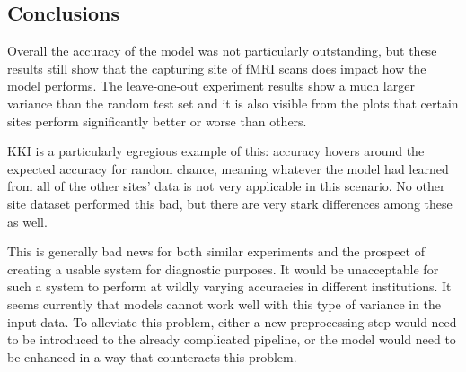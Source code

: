 	
	\subsection{Conclusions}
	
	
	Overall the accuracy of the model was not particularly outstanding, but these results still show that the capturing site of fMRI scans does impact how the model performs. The leave-one-out experiment results show a much larger variance than the random test set and it is also visible from the plots that certain sites perform significantly better or worse than others.
	
	KKI is a particularly egregious example of this: accuracy hovers around the expected accuracy for random chance, meaning whatever the model had learned from all of the other sites' data is not very applicable in this scenario. No other site dataset performed this bad, but there are very stark differences among these as well.
	
	This is generally bad news for both similar experiments and the prospect of creating a usable system for diagnostic purposes. It would be unacceptable for such a system to perform at wildly varying accuracies in different institutions. It seems currently that models cannot work well with this type of variance in the input data. To alleviate this problem, either a new preprocessing step would need to be introduced to the already complicated pipeline, or the model would need to be enhanced in a way that counteracts this problem.
	
	
	
	
	
	
	
	
	
	
	
	
	